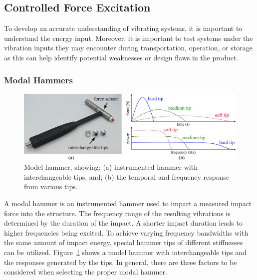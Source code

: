 \documentclass[12pt,letter]{article}
\begin{document}



\subsection{Controlled Force Excitation}

To develop an accurate understanding of vibrating systems, it is important to understand the energy input. Moreover, it is important to test systems under the vibration inputs they may encounter during transportation, operation, or storage as this can help identify potential weaknesses or design flaws in the product.

\subsubsection{Modal Hammers}



\begin{figure}[H]
	\centering
	\includegraphics[width=6.5in]{../figures/modal_hammer}
	\caption{Model hammer, showing: (a) instrumented hammer with interchangeable tips, and; (b) the temporal and frequency response from various tips.}
	\label{fig:modal_hammer}
\end{figure} 


A modal hammer is an instrumented hammer used to impart a measured impact force into the structure. The frequency range of the resulting vibrations is determined by the duration of the impact. A shorter impact duration leads to higher frequencies being excited. To achieve varying frequency bandwidths with the same amount of impact energy, special hammer tips of different stiffnesses can be utilized.  Figure~\ref{fig:modal_hammer} shows a model hammer with interchangeable tips and the responses generated by the tips. In general, there are three factors to be considered when selecting the proper modal hammer.
\end{document}
